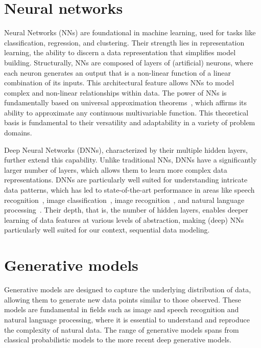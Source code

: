 \section*{Neural networks}
Neural Networks (NNs)
are foundational in machine learning, used for tasks like
classification, regression, and clustering. Their strength lies in
representation learning, the ability to discern a data representation that
simplifies model building. Structurally, NNs are composed of layers of 
(artificial) neurons,
where each neuron generates an output that is a non-linear function of a linear
combination of its inputs. This architectural feature allows NNs to model
complex and non-linear relationships within data. The power of NNs is
fundamentally based on universal approximation 
theorems~\citep{cybenko1989approximation,hornik1991approximation,pinkus1999approximation,lu2017expressive, liang2016deep}, 
which affirms its ability to approximate any continuous multivariable function. This
theoretical basis is fundamental to their versatility and adaptability in a
variety of problem domains.


Deep Neural Networks (DNNs),
characterized by their multiple hidden layers, further extend this
capability. 
Unlike traditional NNs, DNNs have a significantly larger number of layers, which
allows them to learn more complex data representations.
DNNs are particularly well suited for understanding intricate data
patterns, which has led to state-of-the-art performance in areas like speech
recognition~\citep{deng2013new, chan2016listen, abdel2013exploring, nassif2019speech},
image classification~\citep{huang2023comparative},
image recognition~\citep{fu2017look, traore2018deep, zheng2017learning}, and
natural language processing~\citep{li2018deep,collobert2008unified, goldberg2017neural}.
Their depth, that is, the number of hidden layers,
enables deeper  learning of data features at various levels of
abstraction, making (deep) NNs particularly well suited for our context,
sequential data modeling.

\vspace{.30cm}
\section*{Generative models}
Generative models are designed to capture the underlying distribution of data,
allowing them to generate new data points similar to those observed. These
models are fundamental in fields such as image and speech recognition and
natural language processing, where it is essential to understand and reproduce
the complexity of natural data. The range of generative models spans from
classical probabilistic models to the more recent deep generative models.


